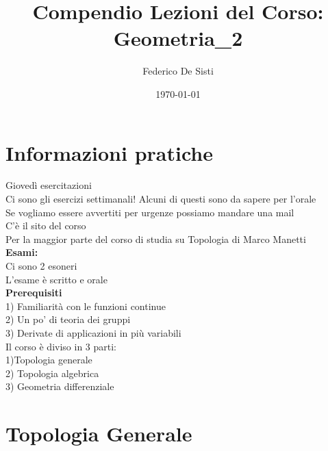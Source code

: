 \documentclass{article}
\title{Compendio Lezioni del Corso: Geometria_2}
\date{\today}
\author{Federico De Sisti}
\begin{document}
\maketitle
\maketitle
	\newpage
	\section{Informazioni pratiche}
	Giovedì esercitazioni\\
	Ci sono gli esercizi settimanali! Alcuni di questi sono da sapere per l'orale\\
	Se vogliamo essere avvertiti per urgenze possiamo mandare una mail\\
	C'è il sito del corso\\
	Per la maggior parte del corso di studia su Topologia di Marco Manetti\\
	\textbf{Esami:}\\
	Ci sono 2 esoneri\\
	L'esame è scritto e orale\\
	\textbf{Prerequisiti}\\
	1) Familiarità con le funzioni continue\\
	2) Un po' di teoria dei gruppi\\
	3) Derivate di applicazioni in più variabili\\[10px]
	Il corso è diviso in 3 parti:\\
	1)Topologia generale\\
	2) Topologia algebrica\\
	3) Geometria differenziale\\
	\section{Topologia Generale}
\end{document}
